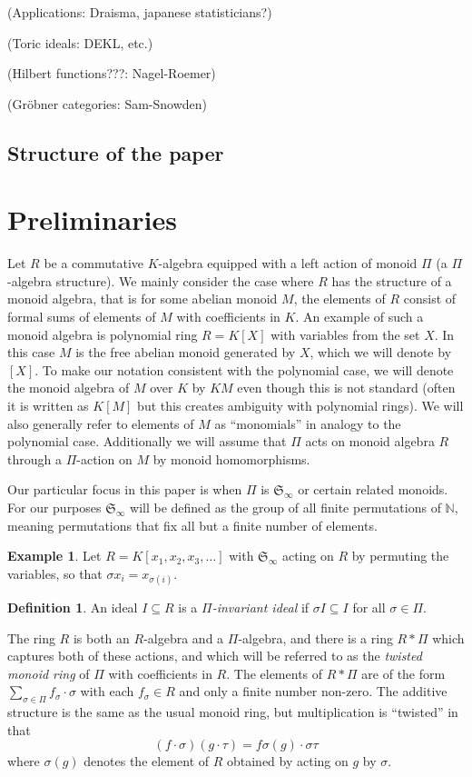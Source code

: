 \documentclass{amsart}
\theoremstyle{definition}
\newtheorem{definition}[theorem]{Definition}
\newtheorem{example}[theorem]{Example}
\theoremstyle{remark}
\numberwithin{equation}{section}
\newcommand{\B}[1]{\mathbb #1}
\newcommand{\F}[1]{\mathfrak #1}
\newcommand{\SymN}{\F S_\infty}
\newcommand{\mon}{M}
\begin{document}
(Applications: Draisma, japanese statisticians?)

(Toric ideals: DEKL, etc.)

(Hilbert functions???: Nagel-Roemer)

(Gr\"obner categories: Sam-Snowden)

\subsection{Structure of the paper}

\section{Preliminaries}
Let $R$ be a commutative $K$-algebra equipped with a left action of monoid $\Pi$ (a $\Pi$-algebra structure).  We mainly consider the case where $R$ has the structure of a monoid algebra, that is for some abelian monoid $\mon$, the elements of $R$ consist of formal sums of elements of $\mon$ with coefficients in $K$.  An example of such a monoid algebra is polynomial ring $R = K[X]$ with variables from the set $X$.  In this case $\mon$ is the free abelian monoid generated by $X$, which we will denote by $[X]$.  To make our notation consistent with the polynomial case, we will denote the monoid algebra of $\mon$ over $K$ by $K\mon$ even though this is not standard (often it is written as $K[\mon]$ but this creates ambiguity with polynomial rings).  We will also generally refer to elements of $\mon$ as ``monomials'' in analogy to the polynomial case.  Additionally we will assume that $\Pi$ acts on monoid algebra $R$ through a $\Pi$-action on $\mon$ by monoid homomorphisms.

Our particular focus in this paper is when $\Pi$ is $\SymN$ or certain related monoids.  For our purposes $\SymN$ will be defined as the group of all finite permutations of $\B N$, meaning permutations that fix all but a finite number of elements.

\begin{example}
 Let $R = K[x_1,x_2,x_3,\ldots]$ with $\SymN$ acting on $R$ by permuting the variables, so that $\sigma x_i = x_{\sigma(i)}$.
\end{example}

\begin{definition}
 An ideal $I \subseteq R$ is a {\em $\Pi$-invariant ideal} if $\sigma I \subseteq I$ for all $\sigma \in \Pi$.
\end{definition}

The ring $R$ is both an $R$-algebra and a $\Pi$-algebra, and there is a ring $R*\Pi$ which captures both of these actions, and which will be referred to as the {\em twisted monoid ring} of $\Pi$ with coefficients in $R$.  The elements of $R*\Pi$ are of the form $\sum_{\sigma \in \Pi} f_{\sigma}\cdot \sigma$ with each $f_\sigma \in R$ and only a finite number non-zero.  The additive structure is the same as the usual monoid ring, but multiplication is ``twisted'' in that
 \[ (f\cdot \sigma)(g \cdot \tau) = f\sigma(g) \cdot \sigma\tau \]
where $\sigma(g)$ denotes the element of $R$ obtained by acting on $g$ by $\sigma$.
\end{document}
